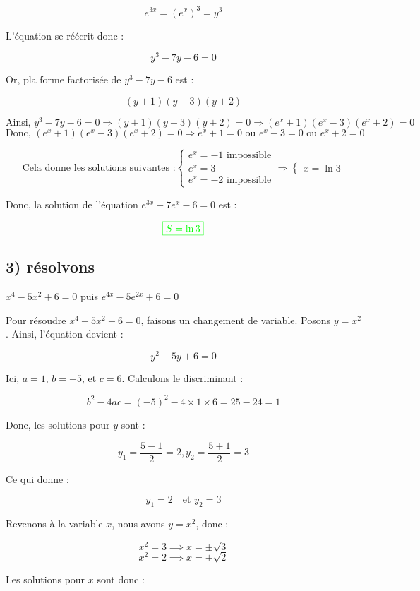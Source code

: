 \documentclass[12pt]{article}
\begin{document}
\[
e^{3x} = (e^x)^3 = y^3
\]

L'équation se réécrit donc :

\[
y^3 - 7y - 6 = 0
\]

Or, pla forme factorisée de \(y^3 - 7y - 6 \) est  :

\[
(y + 1)(y - 3)(y + 2)
\]

\[\text{Ainsi, }
y^3 - 7y - 6=0 \Longrightarrow (y + 1)(y - 3)(y + 2)=0 \Longrightarrow (e^x + 1)(e^x - 3)(e^x + 2)=0
\]
\[\text{Donc, }
(e^x + 1)(e^x - 3)(e^x + 2)=0 \Longrightarrow e^x + 1=0 \text{ ou } e^x - 3=0 \text{ ou } e^x + 2=0
\]

\[\text{Cela donne les solutions suivantes :} \begin{cases}
e^x=-1 \text{ impossible}\\
e^x=3 \\
e^x=-2 \text{ impossible}
\end{cases}
\Longrightarrow
\begin{cases}
x=\ln 3 
\end{cases}
\]


Donc, la solution de l'équation \(e^{3x} - 7e^x - 6 = 0\) est :

\[
\textcolor{green}{\boxed{S=\ln 3}}
\]

\subsection*{3) résolvons } \(x^{4}-5x^{2}+6=0\) puis \(e^{4x}-5e^{2x}+6=0\)

Pour résoudre \(x^{4} - 5x^{2} + 6 = 0\), faisons un changement de variable. Posons \(y = x^2\). Ainsi, l'équation devient :

\[
y^2 - 5y + 6 = 0
\]

Ici, \(a = 1\), \(b = -5\), et \(c = 6\). Calculons le discriminant :

\[
b^2 - 4ac = (-5)^2 - 4 \times 1 \times 6 = 25 - 24 = 1
\]

Donc, les solutions pour \(y\) sont :

\[
y_{1} = \frac{5 - 1}{2} = 2, y_{2} = \frac{5 + 1}{2} = 3
\]

Ce qui donne :

\[
y_{1} = 2 \quad \text{et } y_{2} = 3
\]

Revenons à la variable \(x\), nous avons \(y = x^2\), donc :

\[
x^2 = 3 \implies x = \pm \sqrt{3}
\]
\[
x^2 = 2 \implies x = \pm \sqrt{2}
\]

Les solutions pour \(x\) sont donc :
\end{document}

